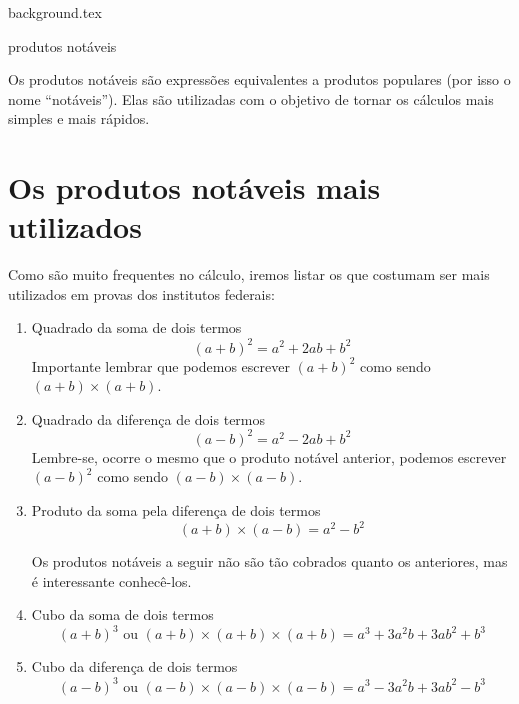 \documentclass[fleqn,10pt]{article}
\begin{document}
    {background.tex} %
        \begin{center}
            {\LARGE {\sc produtos notáveis}}
        \end{center}


\begin{definicao}
    Os produtos notáveis são expressões equivalentes a produtos populares (por isso o nome ``notáveis''). Elas são utilizadas com o objetivo de tornar os cálculos mais simples e mais rápidos.
\end{definicao}
\section*{Os produtos notáveis mais utilizados}
 Como são muito frequentes no cálculo, iremos listar os que costumam ser mais utilizados em provas dos institutos federais:

    \begin{enumerate}[label=\textbf{(\Roman*)}]
        \item Quadrado da soma de dois termos
            \[ (a+b)^2 = a^2 + 2ab + b^2\]
            Importante lembrar que podemos escrever \( (a+b)^2\) como sendo \( (a+b) \times (a+b) \).
        \item Quadrado da diferença de dois termos
            \[ (a-b)^2 = a^2 - 2ab + b^2\]
            Lembre-se, ocorre o mesmo que o produto notável anterior, podemos escrever \( (a-b)^2\) como sendo \( (a-b) \times (a-b) \).
        \item Produto da soma pela diferença de dois termos
            \[ (a+b) \times (a-b)= a^2-b^2 \]
        
        \begin{obs}
        Os produtos notáveis a seguir não são tão cobrados quanto os anteriores, mas é interessante conhecê-los.
        \end{obs}
        \item Cubo da soma de dois termos
            \[ (a+b)^3 \textrm{ ou } (a+b) \times (a+b) \times (a+b) = a^3 + 3a^{2}b + 3ab^2 + b^3 \]
        \item Cubo da diferença de dois termos
            \[ (a-b)^3 \textrm{ ou } (a-b) \times (a-b) \times (a-b) = a^3-3a^{2}b + 3ab^2 - b^3 \]
    \end{enumerate}
    
\end{document}
